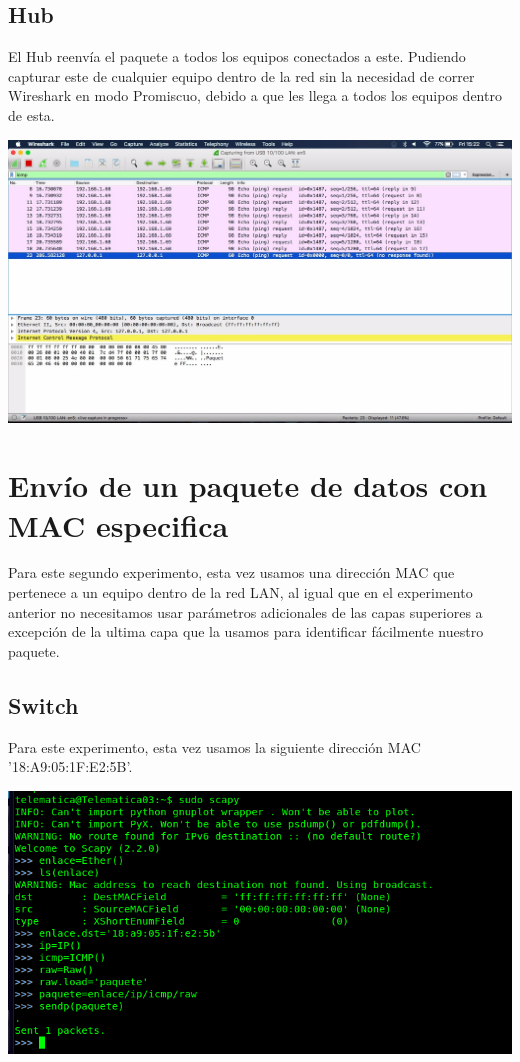 \documentclass[spanish]{udpreport}
\begin{document}
\subsection{Hub}

El Hub reenvía el paquete a todos los equipos conectados a este. Pudiendo capturar este de cualquier equipo dentro de la red sin la necesidad de correr Wireshark en modo Promiscuo, debido a que les llega a todos los equipos dentro de esta.

\begin{center}
	\includegraphics[scale=.3]{imagenes/Hub/FF.jpg}
\end{center}


\section{Envío de un paquete de datos con MAC especifica}

Para este segundo experimento, esta vez usamos una dirección MAC que pertenece a un equipo dentro de la red LAN, al igual que en el experimento anterior no necesitamos usar parámetros adicionales de las capas superiores a excepción de la ultima capa que la usamos para identificar fácilmente nuestro paquete.

\subsection{Switch}

Para este experimento, esta vez usamos la siguiente dirección MAC '18:A9:05:1F:E2:5B'.
\begin{center}
	\includegraphics[scale=.37]{imagenes/Switch/Test_2.png}
\end{center}
\end{document}
